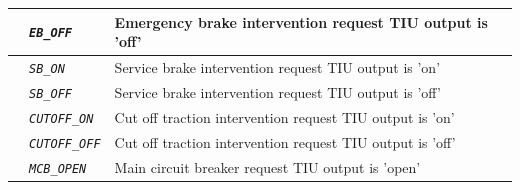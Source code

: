 \documentclass{template/openetcs}
\begin{document}
\begin{itemize}
\begin{longtable}{|l|l|l|}
			\hline			
			
			&	\begin{minipage}[t]{0.40\linewidth} \emph{\texttt{EB\_OFF}} \end{minipage}
			&	\begin{minipage}[t]{0.38\linewidth} Emergency brake intervention request TIU output is ’off’ \end{minipage} \\
			
			\hline
			
			&	\begin{minipage}[t]{0.40\linewidth} \emph{\texttt{SB\_ON}} \end{minipage}
			&	\begin{minipage}[t]{0.38\linewidth} Service brake intervention request TIU output is ’on’ \end{minipage} \\ 

			\hline

			&	\begin{minipage}[t]{0.40\linewidth} \emph{\texttt{SB\_OFF}} \end{minipage}
			&	\begin{minipage}[t]{0.38\linewidth} Service brake intervention request TIU output is ’off’ \end{minipage} \\ 

			\hline

			&	\begin{minipage}[t]{0.40\linewidth} \emph{\texttt{CUTOFF\_ON}} \end{minipage}
			&	\begin{minipage}[t]{0.38\linewidth} Cut off traction intervention request TIU output is ’on’ \end{minipage} \\ 

			\hline

			&	\begin{minipage}[t]{0.40\linewidth} \emph{\texttt{CUTOFF\_OFF}} \end{minipage}
			&	\begin{minipage}[t]{0.38\linewidth} Cut off traction intervention request TIU output is ’off’ \end{minipage} \\ 

			\hline

			&	\begin{minipage}[t]{0.40\linewidth} \emph{\texttt{MCB\_OPEN}} \end{minipage}
			&	\begin{minipage}[t]{0.38\linewidth} Main circuit breaker request TIU output is ’open’ \end{minipage} \\ 


\end{longtable}
\end{itemize}
\end{document}
